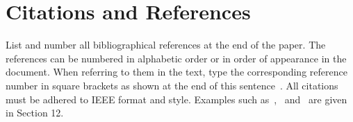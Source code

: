 \documentclass{article}
\begin{document}
\section{Citations and References}

List and number all bibliographical references at the end of the paper. The references can be numbered in alphabetic order or in order of appearance in the document. When referring to them in the text, type the corresponding reference number in square brackets as shown at the end of this sentence~\cite{Morgan2005}. All citations must be adhered to IEEE format and style. Examples such as~\cite{Morgan2005},~\cite{cooley65} and~\cite{haykin02} are given in Section 12.



\end{document}
